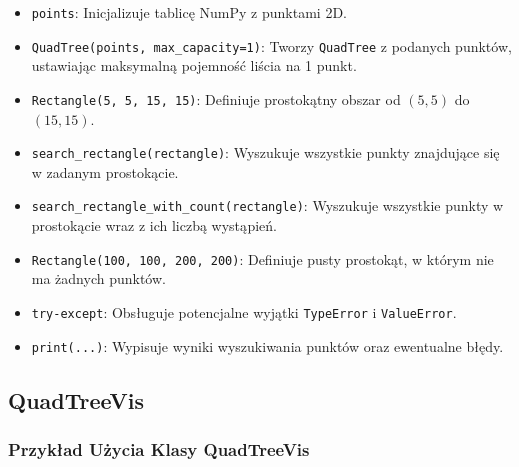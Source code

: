 \documentclass[12pt]{article}
\begin{document}
\begin{itemize}
    \item \texttt{points}: Inicjalizuje tablicę NumPy z punktami 2D.
    \item \texttt{QuadTree(points, max\_capacity=1)}: Tworzy \texttt{QuadTree} z podanych punktów, ustawiając maksymalną pojemność liścia na 1 punkt.
    \item \texttt{Rectangle(5, 5, 15, 15)}: Definiuje prostokątny obszar od \((5,5)\) do \((15,15)\).
    \item \texttt{search\_rectangle(rectangle)}: Wyszukuje wszystkie punkty znajdujące się w zadanym prostokącie.
    \item \texttt{search\_rectangle\_with\_count(rectangle)}: Wyszukuje wszystkie punkty w prostokącie wraz z ich liczbą wystąpień.
    \item \texttt{Rectangle(100, 100, 200, 200)}: Definiuje pusty prostokąt, w którym nie ma żadnych punktów.
    \item \texttt{try-except}: Obsługuje potencjalne wyjątki \texttt{TypeError} i \texttt{ValueError}.
    \item \texttt{print(...)}: Wypisuje wyniki wyszukiwania punktów oraz ewentualne błędy.
\end{itemize}

\subsection{QuadTreeVis}
\subsubsection{Przykład Użycia Klasy QuadTreeVis}
\end{document}

